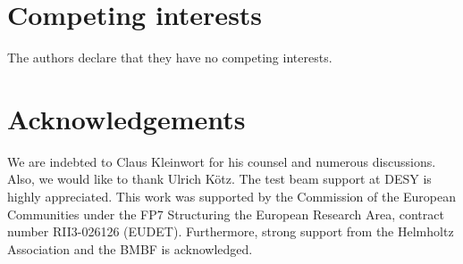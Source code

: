 \documentclass[a4paper,10pt]{article}
\newcommand*{\notFOREPJ}{}%
\begin{document}
\section*{Competing interests}
The authors declare that they have no competing interests.

\section*{Acknowledgements}
We are indebted to Claus Kleinwort for his counsel and numerous discussions. 
Also, we would like to thank Ulrich K\"otz.
The test beam support at DESY is highly appreciated. 
This work was supported by the Commission of the European Communities under the FP7 Structuring the European Research Area, contract number RII3-026126 (EUDET). 
Furthermore, strong support from the Helmholtz Association and the BMBF is acknowledged.

\small

\ifdefined\notFOREPJ

\else

\fi
\end{document}
